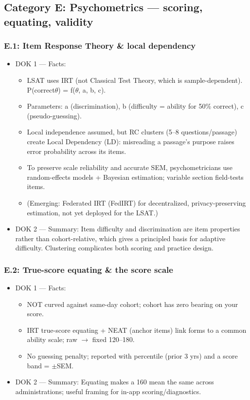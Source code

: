 \documentclass[11pt]{article}
\begin{document}
\subsection*{Category E: Psychometrics --- scoring, equating, validity}
\subsubsection*{E.1: Item Response Theory \& local dependency}
\begin{itemize}
\item DOK 1 --- Facts:
\begin{itemize}
\item LSAT uses IRT (not Classical Test Theory, which is sample-dependent). P(correct\textbar{}$\theta$) = f($\theta$, a, b, c).
\item Parameters: a (discrimination), b (difficulty = ability for 50\% correct), c (pseudo-guessing).
\item Local independence assumed, but RC clusters (5--8 questions/passage) create Local Dependency (LD): misreading a passage's purpose raises error probability across its items.
\item To preserve scale reliability and accurate SEM, psychometricians use random-effects models + Bayesian estimation; variable section field-tests items.
\item (Emerging: Federated IRT (FedIRT) for decentralized, privacy-preserving estimation, not yet deployed for the LSAT.)
\end{itemize}
\item DOK 2 --- Summary: Item difficulty and discrimination are item properties rather than cohort-relative, which gives a principled basis for adaptive difficulty. Clustering complicates both scoring and practice design.
\end{itemize}
\subsubsection*{E.2: True-score equating \& the score scale}
\begin{itemize}
\item DOK 1 --- Facts:
\begin{itemize}
\item NOT curved against same-day cohort; cohort has zero bearing on your score.
\item IRT true-score equating + NEAT (anchor items) link forms to a common ability scale; raw $\rightarrow$ fixed 120--180.
\item No guessing penalty; reported with percentile (prior 3 yrs) and a score band = $\pm$SEM.
\end{itemize}
\item DOK 2 --- Summary: Equating makes a 160 mean the same across administrations; useful framing for in-app scoring/diagnostics.
\end{itemize}
\end{document}
